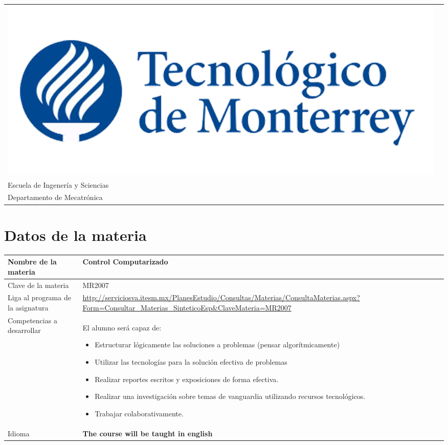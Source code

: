 \documentclass[letter, 10pt]{scrartcl}
\begin{document}

\begin{tabularx}{\linewidth}{Xc}
\includegraphics[width=\linewidth]{../figures/tec-logo.png}
&
\begin{minipage}[b]{0.6\linewidth}
\centering
Campus Estado de M\'exico\\
Escuela de Ingener\'ia y Sciencias\\
Departamento de Mecatr\'onica
\end{minipage}
\end{tabularx} 

%
\section*{Datos de la materia}

\begin{tabularx}{\linewidth}{|L|X|}
\hline
Nombre de la materia & Control Computarizado\\\hline
Clave de la materia & MR2007\\\hline
Liga al programa de la asignatura & \url{http://serviciosva.itesm.mx/PlanesEstudio/Consultas/Materias/ConsultaMaterias.aspx?Form=Consultar_Materias_SinteticoEsp&ClaveMateria=MR2007}\\\hline
Competencias a desarrollar 
& \begin{minipage}[t]{\linewidth}
    El alumno será capaz de:
    \begin{itemize}[noitemsep,nolistsep]
      \item Estructurar lógicamente las soluciones a problemas (pensar algorítmicamente)
      \item Utilizar las tecnologías para la solución efectiva de problemas
      \item Realizar reportes escritos y exposiciones de forma efectiva.
      \item Realizar una investigación sobre temas de vanguardia utilizando recursos tecnológicos.
      \item Trabajar colaborativamente.
    \end{itemize}
  \end{minipage}\\\hline
Idioma & \textbf{The course will be taught in english}\\\hline
\end{tabularx}
\end{document}

